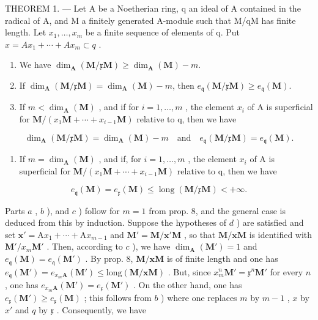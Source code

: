 THEOREM 1. --- Let A be a Noetherian ring, q an ideal of A contained in the radical of A, and M a finitely generated A-module such that M/qM has finite length. Let \(x_{1}, \ldots, x_{m}\) be a finite sequence of elements of q. Put \(x = Ax_{1} + \cdots + Ax_{m} \subset q\) .

\begin{enumerate}
\def\labelenumi{\alph{enumi})}
\item
  We have \(\dim_{\mathbf{A}}(\mathbf{M} / \mathfrak{x}\mathbf{M})\geqslant \dim_{\mathbf{A}}(\mathbf{M}) - m.\)
\item
  If \(\dim_{\mathbf{A}}(\mathbf{M} / \mathfrak{x}\mathbf{M}) = \dim_{\mathbf{A}}(\mathbf{M}) - m\), then \(e_{\mathfrak{q}}(\mathbf{M} / \mathfrak{x}\mathbf{M}) \geqslant e_{\mathfrak{q}}(\mathbf{M})\).
\item
  If \(m < \dim_{\mathbf{A}}(\mathbf{M})\) , and if for \(i = 1, \ldots, m\) , the element \(x_{i}\) of A is superficial for \(\mathbf{M}/(x_{1}\mathbf{M} + \cdots + x_{i-1}\mathbf{M})\) relative to q, then we have
\end{enumerate}

\[
\dim_{\mathbf{A}}(\mathbf{M} / \mathfrak{x}\mathbf{M}) = \dim_{\mathbf{A}}(\mathbf{M}) - m \quad\text{and}\quad e_{\mathfrak{q}}(\mathbf{M} / \mathfrak{x}\mathbf{M}) = e_{\mathfrak{q}}(\mathbf{M}).
\]

\begin{enumerate}
\def\labelenumi{\alph{enumi})}
\setcounter{enumi}{3}
\tightlist
\item
  If \(m = \dim_{\mathbf{A}}(\mathbf{M})\) , and if, for \(i = 1, \ldots, m\) , the element \(x_{i}\) of A is superficial for \(\mathbf{M}/(x_{1}\mathbf{M} + \cdots + x_{i-1}\mathbf{M})\) relative to q, then we have
\end{enumerate}

\[
e _ {\mathfrak {q}} (\mathbf {M}) = e _ {\mathfrak {x}} (\mathbf {M}) \leqslant \operatorname{long} (\mathbf {M} / \mathfrak{x}\mathbf{M}) <   + \infty .
\]

Parts \(a\) , \(b\) ), and \(c\) ) follow for \(m = 1\) from prop. 8, and the general case is deduced from this by induction. Suppose the hypotheses of \(d\) ) are satisfied and set \(\mathbf{x}' = \mathrm{A}x_{1} + \cdots + \mathrm{A}x_{m-1}\) and \(\mathbf{M}' = \mathbf{M}/\mathbf{x}'\mathbf{M}\) , so that \(\mathbf{M}/\mathbf{x}\mathbf{M}\) is identified with \(\mathbf{M}'/x_{m}\mathbf{M}'\) . Then, according to \(c\) ), we have \(\dim_{\mathbf{A}}(\mathbf{M}') = 1\) and \(e_{\mathfrak{q}}(\mathbf{M}) = e_{\mathfrak{q}}(\mathbf{M}')\) . By prop. 8, \(\mathbf{M}/\mathbf{x}\mathbf{M}\) is of finite length and one has \(e_{\mathfrak{q}}(\mathbf{M}') = e_{x_{m}\mathbf{A}}(\mathbf{M}') \leqslant \text{long}(\mathbf{M}/\mathbf{x}\mathbf{M})\) . But, since \(x_{m}^{n}\mathbf{M}' = \mathfrak{x}^{n}\mathbf{M}'\) for every \(n\) , one has \(e_{x_{m}\mathbf{A}}(\mathbf{M}') = e_{\mathfrak{x}}(\mathbf{M}')\) . On the other hand, one has \(e_{\mathfrak{x}}(\mathbf{M}') \geqslant e_{\mathfrak{x}}(\mathbf{M})\) ; this follows from \(b\) ) where one replaces \(m\) by \(m - 1\) , \(x\) by \(x'\) and \(q\) by \(\mathfrak{x}\) . Consequently, we have

